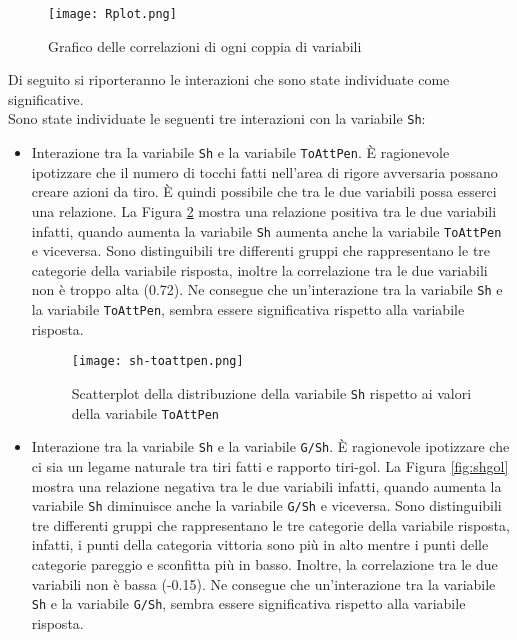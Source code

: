 \begin{figure}[htbp]
	\begin{center}
		\texttt{[image: Rplot.png]}
		\caption{Grafico delle correlazioni di ogni coppia di variabili}  \label{fig:cor}
	\end{center}
\end{figure}

Di seguito si riporteranno le interazioni che sono state individuate come significative.\\ 


Sono state individuate le seguenti tre interazioni con la variabile \texttt{Sh}:
\begin{itemize}
	\item Interazione tra la variabile \texttt{Sh} e la variabile \texttt{ToAttPen}. È ragionevole ipotizzare che il numero di tocchi fatti nell'area di rigore avversaria possano creare azioni da tiro. È quindi possibile che tra le due variabili possa esserci una relazione. La Figura \ref{fig:shpen} mostra una relazione  positiva tra le due variabili infatti, quando aumenta la variabile \texttt{Sh} aumenta anche la variabile \texttt{ToAttPen} e viceversa. Sono distinguibili tre differenti gruppi che rappresentano le tre categorie della variabile risposta, inoltre la correlazione tra le due variabili non è troppo alta (0.72). Ne consegue che un'interazione tra la variabile \texttt{Sh} e la variabile \texttt{ToAttPen}, sembra essere significativa rispetto alla variabile risposta.
	\begin{figure}[htbp]
		\begin{center}
			\texttt{[image: sh-toattpen.png]}
			\caption{Scatterplot della distribuzione della variabile \texttt{Sh} rispetto ai valori della variabile \texttt{ToAttPen}}  \label{fig:shpen}
		\end{center}
	\end{figure}
	
	\item Interazione tra la variabile \texttt{Sh} e la variabile \texttt{G/Sh}. È ragionevole ipotizzare che ci sia un legame naturale tra tiri fatti e rapporto tiri-gol. La Figura \ref{fig:shgol} mostra una relazione negativa tra le due variabili infatti, quando aumenta la variabile \texttt{Sh} diminuisce anche la variabile \texttt{G/Sh} e viceversa. Sono distinguibili tre differenti gruppi che rappresentano le tre categorie della variabile risposta, infatti, i punti della categoria vittoria sono più in alto mentre i punti delle categorie pareggio e sconfitta più in basso. Inoltre, la correlazione tra le due variabili non è bassa (-0.15). Ne consegue che un'interazione tra la variabile \texttt{Sh} e la variabile \texttt{G/Sh}, sembra essere significativa rispetto alla variabile risposta.
	

\end{itemize}
